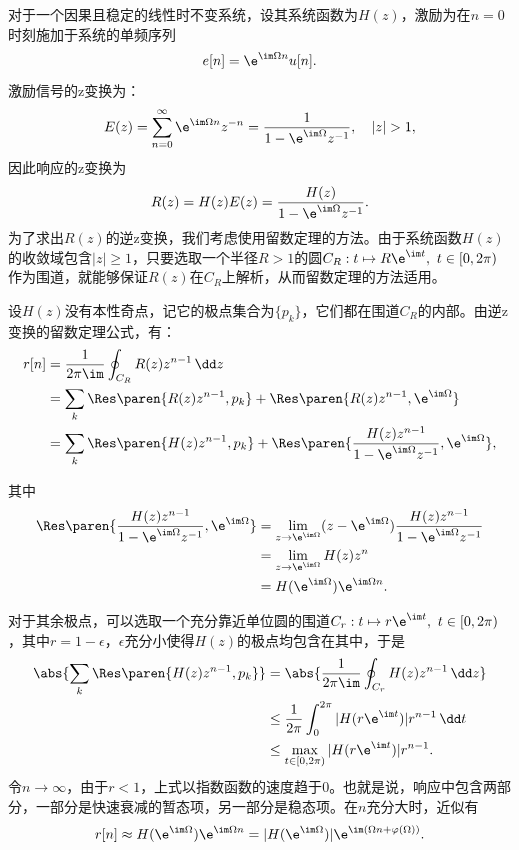 \begin{example}
    对于一个因果且稳定的线性时不变系统，设其系统函数为$H(z)$，激励为在$n=0$时刻施加于系统的单频序列
    \begin{equation}
        e[n]=\e^{\im\Omega n}u[n].
    \end{equation}
    激励信号的z变换为：
    \begin{equation}
        E(z)=\sum_{n=0}^{\infty}\e^{\im\Omega n}z^{-n}=\frac{1}{1-\e^{\im\Omega}z^{-1}},\quad |z|>1,
    \end{equation}
    因此响应的z变换为
    \begin{equation}
        R(z)=H(z)E(z)=\frac{H(z)}{1-\e^{\im\Omega}z^{-1}}.
    \end{equation}
    为了求出$R(z)$的逆z变换，我们考虑使用留数定理的方法。由于系统函数$H(z)$的收敛域包含$|z|\geq 1$，只要选取一个半径$R>1$的圆$C_R:t\mapsto R\e^{\im t},\ t\in[0,2\pi)$作为围道，就能够保证$R(z)$在$C_R$上解析，从而留数定理的方法适用。

    设$H(z)$没有本性奇点，记它的极点集合为$\{p_k\}$，它们都在围道$C_R$的内部。由逆z变换的留数定理公式，有：
    \begin{align}
        r[n]&=\frac{1}{2\pi\im}\oint_{C_R}R(z)z^{n-1}\,\dd z \nonumber \\
        &=\sum_{k}\Res\paren{R(z)z^{n-1},p_k}+\Res\paren{R(z)z^{n-1},\e^{\im\Omega}} \nonumber \\
        &=\sum_{k}\Res\paren{H(z)z^{n-1},p_k}+\Res\paren{\frac{H(z)z^{n-1}}{1-\e^{\im\Omega}z^{-1}},\e^{\im\Omega}},
    \end{align}

    其中
    \begin{align}
        \Res\paren{\frac{H(z)z^{n-1}}{1-\e^{\im\Omega}z^{-1}},\e^{\im\Omega}}&=\lim_{z\to \e^{\im\Omega}}(z-\e^{\im\Omega})\frac{H(z)z^{n-1}}{1-\e^{\im\Omega}z^{-1}} \nonumber \\
        &=\lim_{z\to \e^{\im\Omega}}H(z)z^n \nonumber \\
        &=H(\e^{\im\Omega})\e^{\im\Omega n}.
    \end{align}

    对于其余极点，可以选取一个充分靠近单位圆的围道$C_r:t\mapsto r\e^{\im t},\ t\in[0,2\pi)$，其中$r=1-\epsilon$，$\epsilon$充分小使得$H(z)$的极点均包含在其中，于是
    \begin{align}
        \abs{\sum_{k}\Res\paren{H(z)z^{n-1},p_k}}&=\abs{\frac{1}{2\pi\im}\oint_{C_r}H(z)z^{n-1}\,\dd z} \nonumber \\
        &\leq \frac{1}{2\pi}\int_{0}^{2\pi}|H(r\e^{\im t})|r^{n-1}\,\dd t \nonumber \\
        &\leq \max_{t\in[0,2\pi)}|H(r\e^{\im t})|r^{n-1}.
    \end{align}
    令$n\to\infty$，由于$r<1$，上式以指数函数的速度趋于$0$。也就是说，响应中包含两部分，一部分是快速衰减的暂态项，另一部分是稳态项。在$n$充分大时，近似有
    \begin{equation}
        r[n]\approx H(\e^{\im\Omega})\e^{\im\Omega n}=|H(\e^{\im\Omega})|\e^{\im(\Omega n+\varphi(\Omega))}.
    \end{equation}


\end{example}

